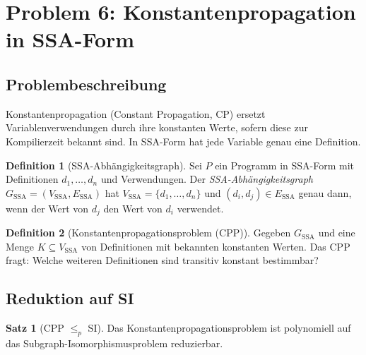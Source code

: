 ﻿\documentclass[a4paper,12pt]{article}
\theoremstyle{definition}
\newtheorem{definition}{Definition}
\newtheorem{satz}{Satz}
\begin{document}
\section{Problem 6: Konstantenpropagation in SSA-Form}
\label{sec:const}

\subsection{Problembeschreibung}

Konstantenpropagation (Constant Propagation, CP) ersetzt Variablenverwendungen durch ihre konstanten Werte, sofern diese zur Kompilierzeit bekannt sind. In SSA-Form hat jede Variable genau eine Definition.

\begin{definition}[SSA-Abhängigkeitsgraph]
\label{def:ssa}
Sei $P$ ein Programm in SSA-Form mit Definitionen $d_1, \ldots, d_n$ und Verwendungen. Der \emph{SSA-Abhängigkeitsgraph} $G_{\text{SSA}} = (V_{\text{SSA}}, E_{\text{SSA}})$ hat $V_{\text{SSA}} = \{d_1, \ldots, d_n\}$ und $(d_i, d_j) \in E_{\text{SSA}}$ genau dann, wenn der Wert von $d_j$ den Wert von $d_i$ verwendet.
\end{definition}

\begin{definition}[Konstantenpropagationsproblem (CPP)]
\label{def:cpp}
Gegeben $G_{\text{SSA}}$ und eine Menge $K \subseteq V_{\text{SSA}}$ von Definitionen mit bekannten konstanten Werten. Das CPP fragt: Welche weiteren Definitionen sind transitiv konstant bestimmbar?
\end{definition}

\subsection{Reduktion auf SI}

\begin{satz}[CPP $\leq_p$ SI]
\label{satz:cpp-si}
Das Konstantenpropagationsproblem ist polynomiell auf das Subgraph-Isomorphismusproblem reduzierbar.
\end{satz}
\end{document}
